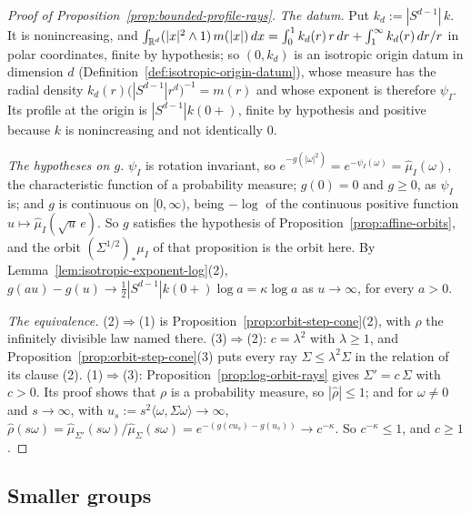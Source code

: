 \begin{proof}[Proof of Proposition~\ref{prop:bounded-profile-rays}]
\emph{The datum.} Put $k_d := |S^{d-1}|\,k$. It is nonincreasing, and
$\int_{\mathbb{R}^d}(|x|^2 \wedge 1)\,m(|x|)\,dx = \int_0^1 k_d(r)\,r\,dr + \int_1^\infty k_d(r)\,dr/r$ in
polar coordinates, finite by hypothesis; so $(0,k_d)$ is an isotropic origin datum in dimension
$d$ (Definition~\ref{def:isotropic-origin-datum}), whose \Levy{} measure has the radial density
$k_d(r)\bigl(|S^{d-1}|r^d\bigr)^{-1} = m(r)$ and whose exponent is therefore $\psi_I$. Its profile at
the origin is $|S^{d-1}|k(0{+})$, finite by hypothesis and positive because $k$ is nonincreasing and
not identically $0$.

\emph{The hypotheses on $g$.} $\psi_I$ is rotation invariant, so $e^{-g(|\omega|^2)} =
e^{-\psi_I(\omega)} = \widehat\mu_I(\omega)$, the characteristic function of a probability measure;
$g(0) = 0$ and $g \ge 0$, as $\psi_I$ is; and $g$ is continuous on $[0,\infty)$, being $-\log$ of
the continuous positive function
$u \mapsto \widehat\mu_I(\sqrt u\,e)$. So $g$ satisfies the hypothesis of Proposition~\ref{prop:affine-orbits}, and
the orbit $(\Sigma^{1/2})_*\mu_I$ of that proposition is the orbit here. By
Lemma~\ref{lem:isotropic-exponent-log}(2), $g(au) - g(u) \to \tfrac12|S^{d-1}|k(0{+})\log a = \kappa\log a$
as $u \to \infty$, for every $a > 0$.

\emph{The equivalence.} (2)$\Rightarrow$(1) is Proposition~\ref{prop:orbit-step-cone}(2), with $\rho$ the
infinitely divisible law named there. (3)$\Rightarrow$(2): $c = \lambda^2$ with $\lambda \ge 1$, and
Proposition~\ref{prop:orbit-step-cone}(3) puts every ray $\Sigma \le \lambda^2\Sigma$ in the relation of its
clause (2). (1)$\Rightarrow$(3): Proposition~\ref{prop:log-orbit-rays} gives $\Sigma' = c\,\Sigma$ with $c > 0$.
Its proof shows that $\rho$ is a probability measure, so $|\widehat\rho| \le 1$; and for
$\omega \ne 0$ and $s \to \infty$, with $u_s := s^2\langle\omega,\Sigma\omega\rangle \to \infty$,
$\widehat\rho(s\omega) = \widehat\mu_{\Sigma'}(s\omega)/\widehat\mu_\Sigma(s\omega) =
e^{-(g(cu_s) - g(u_s))} \to c^{-\kappa}$. So $c^{-\kappa} \le 1$, and $c \ge 1$.
\end{proof}

\subsection{Smaller groups}

